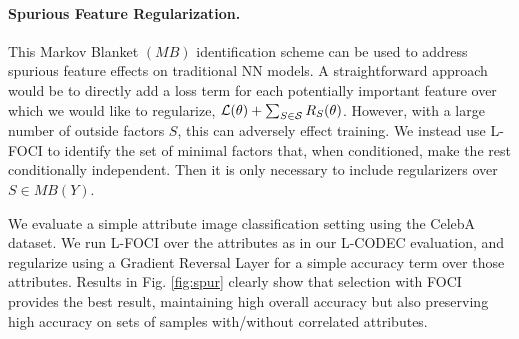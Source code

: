 \paragraph{Spurious Feature Regularization.}
This Markov Blanket $(MB)$ identification scheme can be used to address spurious feature effects on traditional NN models.
A straightforward approach would be to directly add a loss term for each potentially important feature over which we would like to regularize, 
$\mathcal{L}(\theta) + \sum_{S\in \mathcal{S}} R_S(\theta)$.
However, with a large number of outside factors $S$, this can adversely effect training.
We instead use L-FOCI to identify the set of minimal factors that, when conditioned, make the rest conditionally independent. Then it is only necessary to include regularizers over $S \in MB(Y)$.

We evaluate a simple attribute image classification setting using the CelebA dataset. We run L-FOCI over the attributes as in our L-CODEC evaluation, and regularize using a Gradient Reversal Layer for a simple accuracy term over those attributes.
Results in Fig. \ref{fig:spur} clearly show that selection with FOCI provides the best result, maintaining high overall accuracy but also preserving high accuracy on sets of samples with/without correlated attributes.

